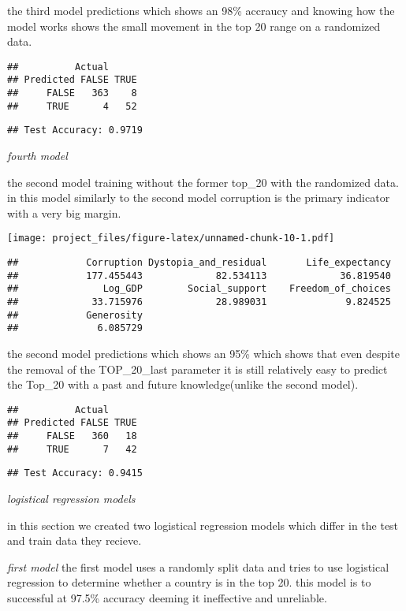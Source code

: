 \documentclass[
]{article}
\begin{document}
the third model predictions which shows an 98\% accraucy and knowing how
the model works shows the small movement in the top 20 range on a
randomized data.

\begin{verbatim}
##          Actual
## Predicted FALSE TRUE
##     FALSE   363    8
##     TRUE      4   52
\end{verbatim}

\begin{verbatim}
## Test Accuracy: 0.9719
\end{verbatim}

\emph{fourth model}

the second model training without the former top\_20 with the randomized
data. in this model similarly to the second model corruption is the
primary indicator with a very big margin.

\texttt{[image: project\_files/figure-latex/unnamed-chunk-10-1.pdf]}

\begin{verbatim}
##            Corruption Dystopia_and_residual       Life_expectancy 
##            177.455443             82.534113             36.819540 
##               Log_GDP        Social_support    Freedom_of_choices 
##             33.715976             28.989031              9.824525 
##            Generosity 
##              6.085729
\end{verbatim}

the second model predictions which shows an 95\% which shows that even
despite the removal of the TOP\_20\_last parameter it is still
relatively easy to predict the Top\_20 with a past and future
knowledge(unlike the second model).

\begin{verbatim}
##          Actual
## Predicted FALSE TRUE
##     FALSE   360   18
##     TRUE      7   42
\end{verbatim}

\begin{verbatim}
## Test Accuracy: 0.9415
\end{verbatim}

\emph{logistical regression models}

in this section we created two logistical regression models which differ
in the test and train data they recieve.

\emph{first model} the first model uses a randomly split data and tries
to use logistical regression to determine whether a country is in the
top 20. this model is to successful at 97.5\% accuracy deeming it
ineffective and unreliable.
\end{document}
